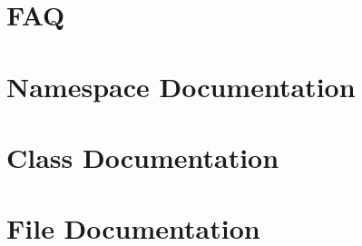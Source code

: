 \documentclass[twoside]{article}
\newcommand{\+}{\discretionary{\mbox{\scriptsize$\hookleftarrow$}}{}{}}
\newcommand{\clearemptydoublepage}{%
  \newpage{\pagestyle{empty}\cleardoublepage}%
}
\begin{document}
\section{F\+AQ}
\label{md_documentation__f_a_q}

\section{Namespace Documentation}




\section{Class Documentation}










































\section{File Documentation}





















\newpage
{}
\clearemptydoublepage
{}
\printindex
\end{document}
